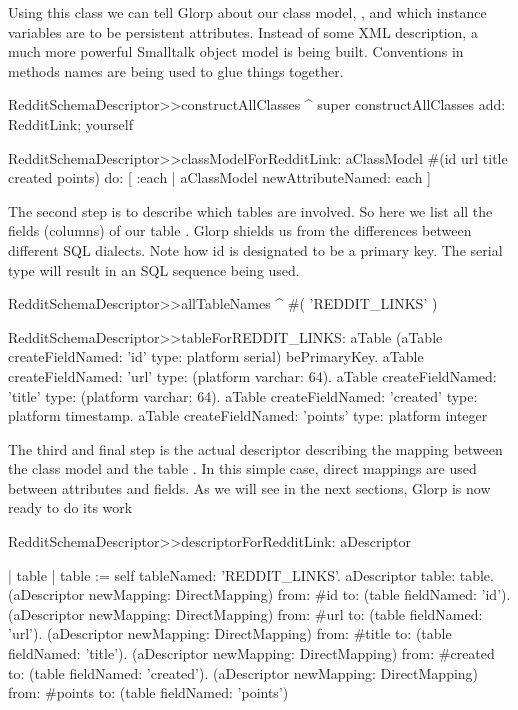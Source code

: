 \documentclass[a4paper,10pt,twoside]{book}
\begin{document}
Using this class we can tell Glorp about our class model, , and which instance variables are to be persistent attributes. Instead of some XML description, a much more powerful Smalltalk object model is being built. Conventions in methods names are being used to glue things together.


\begin{code}{}
RedditSchemaDescriptor>>constructAllClasses
    ^ super constructAllClasses add: RedditLink; yourself

RedditSchemaDescriptor>>classModelForRedditLink: aClassModel
    #(id url title created points) do: [ :each | aClassModel newAttributeNamed: each ]
\end{code}

The second step is to describe which tables are involved. So here we list all the fields (columns) of our table . Glorp shields us from the differences between different SQL dialects. Note how id is designated to be a primary key. The serial type will result in an SQL sequence being used. 

\begin{code}{}
RedditSchemaDescriptor>>allTableNames
     ^ #( 'REDDIT_LINKS' )

RedditSchemaDescriptor>>tableForREDDIT_LINKS: aTable
     (aTable createFieldNamed: 'id' type: platform serial) bePrimaryKey. 
     aTable createFieldNamed: 'url' type: (platform varchar: 64). 
     aTable createFieldNamed: 'title' type: (platform varchar: 64). 
     aTable createFieldNamed: 'created' type: platform timestamp.
     aTable createFieldNamed: 'points' type: platform integer
\end{code}

The third and final step is the actual descriptor describing the mapping between the class model  and the table . In this simple case, direct mappings are used between attributes and fields. As we will see in the next sections, Glorp is now ready to do its work

\begin{code}{}
RedditSchemaDescriptor>>descriptorForRedditLink: aDescriptor

     | table | 
     table := self tableNamed: 'REDDIT_LINKS'. 
     aDescriptor table: table. (aDescriptor newMapping: DirectMapping) from: #id to: (table fieldNamed: 'id'). 
     (aDescriptor newMapping: DirectMapping) from: #url to: (table fieldNamed: 'url'). 
     (aDescriptor newMapping: DirectMapping) from: #title to: (table fieldNamed: 'title'). 
     (aDescriptor newMapping: DirectMapping) from: #created to: (table fieldNamed: 'created'). 
     (aDescriptor newMapping: DirectMapping) from: #points to: (table fieldNamed: 'points')
\end{code}
\end{document}
